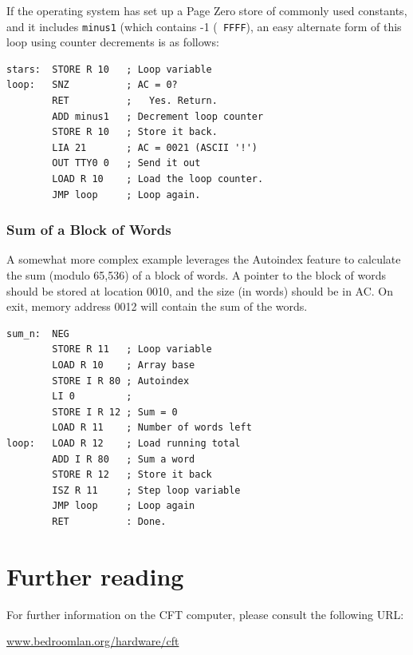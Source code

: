 \documentclass[11pt,a4paper,twocolumns]{article}
\newcommand\link[1]{\sf\href{http://#1}{#1}}
\newcommand\hex[1]{\textsf{#1}}
\newcommand\register[1]{\textsf{#1}}
\newcommand\A{\register{AC}}
\begin{document}
If the operating system has set up a Page Zero store of commonly used
constants, and it includes {\tt minus1} (which contains -1 ({\tt
  FFFF}), an easy alternate form of this loop using counter decrements
is as follows:

\begin{verbatim}
stars:  STORE R 10   ; Loop variable
loop:   SNZ          ; AC = 0?
        RET          ;   Yes. Return.
        ADD minus1   ; Decrement loop counter
        STORE R 10   ; Store it back.
        LIA 21       ; AC = 0021 (ASCII '!')
        OUT TTY0 0   ; Send it out
        LOAD R 10    ; Load the loop counter.
        JMP loop     ; Loop again.
\end{verbatim}

\subsubsection{Sum of a Block of Words}

A somewhat more complex example leverages the Autoindex feature to
calculate the sum (modulo 65,536) of a block of words. A pointer to
the block of words should be stored at location \hex{0010}, and the
size (in words) should be in \A. On exit, memory address \hex{0012}
will contain the sum of the words.

\begin{verbatim}
sum_n:  NEG
        STORE R 11   ; Loop variable
        LOAD R 10    ; Array base
        STORE I R 80 ; Autoindex
        LI 0         ; 
        STORE I R 12 ; Sum = 0
        LOAD R 11    ; Number of words left
loop:   LOAD R 12    ; Load running total
        ADD I R 80   ; Sum a word
        STORE R 12   ; Store it back
        ISZ R 11     ; Step loop variable
        JMP loop     ; Loop again
        RET          : Done.
\end{verbatim}

\section{Further reading}

For further information on the CFT computer, please consult the
following URL:

\begin{center}
\link{www.bedroomlan.org/hardware/cft}
\end{center}
\end{document}
